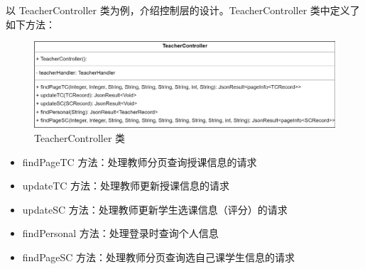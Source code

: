 \documentclass[12pt, a4paper]{article}
\begin{document}
以 TeacherController 类为例，介绍控制层的设计。TeacherController 类中定义了如下方法：
\begin{figure}[H]
  \centering
  \includegraphics[width = 0.9 \textwidth]{TeacherController.png}
  \caption{TeacherController 类}
\end{figure}
\begin{itemize}
  \item findPageTC 方法：处理教师分页查询授课信息的请求
  \item updateTC 方法：处理教师更新授课信息的请求
  \item updateSC 方法：处理教师更新学生选课信息（评分）的请求
  \item findPersonal 方法：处理登录时查询个人信息
  \item findPageSC 方法：处理教师分页查询选自己课学生信息的请求
\end{itemize}
\end{document}
